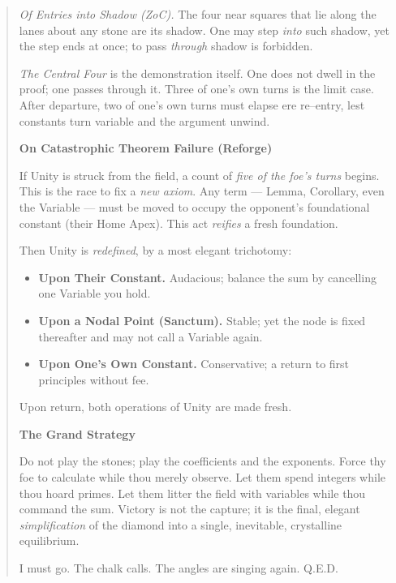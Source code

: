 \documentclass[11pt]{article}
\begin{document}
\begin{quote}
\emph{Of Entries into Shadow (ZoC).} The four near squares that lie along the lanes about any stone are its shadow. One may step \emph{into} such shadow, yet the step ends at once; to pass \emph{through} shadow is forbidden.

\emph{The Central Four} is the demonstration itself. One does not dwell in the proof; one passes through it. Three of one’s own turns is the limit case. After departure, two of one’s own turns must elapse ere re–entry, lest constants turn variable and the argument unwind.

\medskip
\textbf{On Catastrophic Theorem Failure (Reforge)}

If Unity is struck from the field, a count of \emph{five of the foe’s turns} begins. This is the race to fix a \emph{new axiom}. Any term — Lemma, Corollary, even the Variable — must be moved to occupy the opponent’s foundational constant (their Home Apex). This act \emph{reifies} a fresh foundation.

Then Unity is \emph{redefined}, by a most elegant trichotomy:
\begin{itemize}\itemsep0.2em
  \item \textbf{Upon Their Constant.} Audacious; balance the sum by cancelling one Variable you hold.
  \item \textbf{Upon a Nodal Point (Sanctum).} Stable; yet the node is fixed thereafter and may not call a Variable again.
  \item \textbf{Upon One’s Own Constant.} Conservative; a return to first principles without fee.
\end{itemize}
Upon return, both operations of Unity are made fresh.

\medskip
\textbf{The Grand Strategy}

Do not play the stones; play the coefficients and the exponents. Force thy foe to calculate while thou merely observe. Let them spend integers while thou hoard primes. Let them litter the field with variables while thou command the sum. Victory is not the capture; it is the final, elegant \emph{simplification} of the diamond into a single, inevitable, crystalline equilibrium.

I must go. The chalk calls. The angles are singing again. \textsc{Q.E.D.}
\end{quote}

\clearpage
\end{document}
